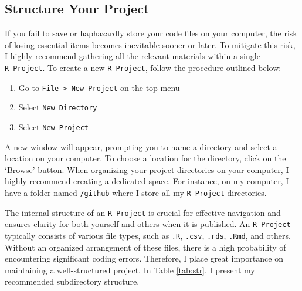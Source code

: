 \documentclass[
]{book}
\providecommand{\tightlist}{%
  \setlength{\itemsep}{0pt}\setlength{\parskip}{0pt}}
\begin{document}
\hypertarget{structure-your-project}{%
\subsection{Structure Your Project}\label{structure-your-project}}

If you fail to save or haphazardly store your code files on your computer, the risk of losing essential items becomes inevitable sooner or later. To mitigate this risk, I highly recommend gathering all the relevant materials within a single \texttt{R\ Project}. To create a new \texttt{R\ Project}, follow the procedure outlined below:

\begin{enumerate}
\def\labelenumi{\alph{enumi}.}
\tightlist
\item
  Go to \texttt{File\ \textgreater{}\ New\ Project} on the top menu
\item
  Select \texttt{New\ Directory}
\item
  Select \texttt{New\ Project}
\end{enumerate}

A new window will appear, prompting you to name a directory and select a location on your computer. To choose a location for the directory, click on the `Browse' button. When organizing your project directories on your computer, I highly recommend creating a dedicated space. For instance, on my computer, I have a folder named \texttt{/github} where I store all my \texttt{R\ Project} directories.

The internal structure of an \texttt{R\ Project} is crucial for effective navigation and ensures clarity for both yourself and others when it is published. An \texttt{R\ Project} typically consists of various file types, such as \texttt{.R}, \texttt{.csv}, \texttt{.rds}, \texttt{.Rmd}, and others. Without an organized arrangement of these files, there is a high probability of encountering significant coding errors. Therefore, I place great importance on maintaining a well-structured project. In Table \ref{tab:str}, I present my recommended subdirectory structure.
\end{document}
